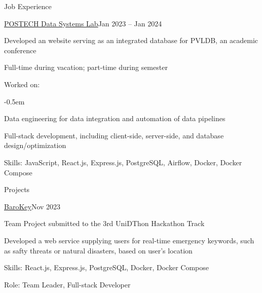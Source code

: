 \documentclass{resume}
\begin{document}
\begin{rSection}{Job Experience}
    \begin{rSubsection}{\href{https://dslab.postech.ac.kr/}{POSTECH Data
        Systems Lab}}{Jan 2023 -- Jan 2024}

        {\bfseries{}}

        \item Developed an website serving as an integrated database for PVLDB,
            an academic conference

        \item Full-time during vacation; part-time during semester

        \item Worked on:

        \vspace{-0.5em}
        \begin{list}{--}{}
            \itemsep -0.5em

            \item Data engineering for data integration and automation of data
                pipelines

            \item Full-stack development, including client-side, server-side,
                and database design/optimization 
        \end{list}

        \item Skills: JavaScript, React.js, Express.js, PostgreSQL, Airflow,
            Docker, Docker Compose
    \end{rSubsection}
\end{rSection}

\begin{rSection}{Projects}

    \begin{rSubsection}{\href{https://github.com/UniD3-Hackathon-Team4/barokey}
        {BaroKey}}{Nov 2023}

        Team Project submitted to the 3rd UniDThon Hackathon Track

        \item Developed a web service supplying users for real-time emergency
            keywords, such as safty threats or natural disasters, based on
            user's location

        \item Skills: React.js, Express.js, PostgreSQL, Docker, Docker Compose

        \item Role: Team Leader, Full-stack Developer
    \end{rSubsection}
\end{rSection}
\end{document}
